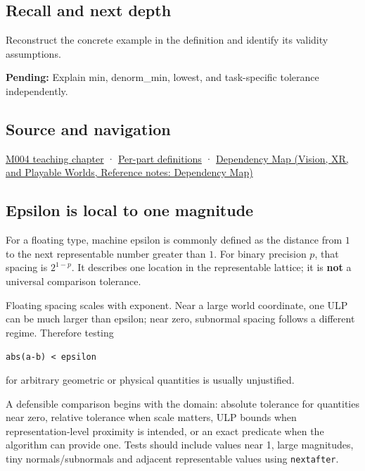 \subsection{Recall and next depth}\label{appendix-390ea641da54-recall-and-next-depth}

\hypertarget{appendix-390ea641da54-recall-and-next-depth}{}

Reconstruct the concrete example in the definition and identify its validity assumptions.

\textbf{Pending:} Explain min, denorm\_min, lowest, and task-specific tolerance independently.

\subsection{Source and navigation}\label{appendix-390ea641da54-source-and-navigation}

\hypertarget{appendix-390ea641da54-source-and-navigation}{}

\hyperref[01-foundations-i-ch001-a-stretching-ruler-for-real-valued-quantities]{M004 teaching chapter} · \hyperref[appendix-fd090d982a15-m004---parts-61-76]{Per-part definitions} · \href{../07-Vision-XR-and-Playable-Worlds/main.pdf\#nameddest=appendix-4ad47bdd269a}{Dependency Map (Vision, XR, and Playable Worlds, Reference notes: Dependency Map)}

\subsection{Epsilon is local to one magnitude}\label{appendix-390ea641da54-epsilon-is-local-to-one-magnitude}

\hypertarget{appendix-390ea641da54-epsilon-is-local-to-one-magnitude}{}

For a floating type, machine epsilon is commonly defined as the distance from \(1\) to the next representable number greater than \(1\). For binary precision \(p\), that spacing is \(2^{1-p}\). It describes one location in the representable lattice; it is \textbf{not} a universal comparison tolerance.

Floating spacing scales with exponent. Near a large world coordinate, one ULP can be much larger than epsilon; near zero, subnormal spacing follows a different regime. Therefore testing

\texttt{abs(a-b)\ \textless{}\ epsilon}

for arbitrary geometric or physical quantities is usually unjustified.

A defensible comparison begins with the domain: absolute tolerance for quantities near zero, relative tolerance when scale matters, ULP bounds when representation-level proximity is intended, or an exact predicate when the algorithm can provide one. Tests should include values near 1, large magnitudes, tiny normals/subnormals and adjacent representable values using \texttt{nextafter}.
